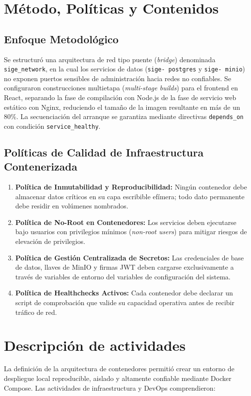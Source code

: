\documentclass[12pt,a4paper]{article}
\begin{document}
\section{Método, Políticas y Contenidos}
\subsection{Enfoque Metodológico}
Se estructuró una arquitectura de red tipo puente (\textit{bridge}) denominada \texttt{sige\_\allowbreak  network}, en la cual los servicios de datos (\texttt{sige- postgres} y \texttt{sige- minio}) no exponen puertos sensibles de administración hacia redes no confiables. Se configuraron construcciones multietapa (\textit{multi-stage builds}) para el frontend en React, separando la fase de compilación con Node.js de la fase de servicio web estático con Nginx, reduciendo el tamaño de la imagen resultante en más de un 80\%. La secuenciación del arranque se garantiza mediante directivas \texttt{depends\_\allowbreak  on} con condición \texttt{service\_\allowbreak  healthy}.

\subsection{Políticas de Calidad de Infraestructura Contenerizada}
\begin{enumerate}[leftmargin=1.5em, itemsep=2pt]
    \item \textbf{Política de Inmutabilidad y Reproducibilidad:} Ningún contenedor debe almacenar datos críticos en su capa escribible efímera; todo dato permanente debe residir en volúmenes nombrados.
    \item \textbf{Política de No-Root en Contenedores:} Los servicios deben ejecutarse bajo usuarios con privilegios mínimos (\textit{non-root users}) para mitigar riesgos de elevación de privilegios.
    \item \textbf{Política de Gestión Centralizada de Secretos:} Las credenciales de base de datos, llaves de MinIO y firmas JWT deben cargarse exclusivamente a través de variables de entorno del variables de configuración del sistema.
    \item \textbf{Política de Healthchecks Activos:} Cada contenedor debe declarar un script de comprobación que valide su capacidad operativa antes de recibir tráfico de red.
\end{enumerate}

\section{Descripción de actividades}
La definición de la arquitectura de contenedores permitió crear un entorno de despliegue local reproducible, aislado y altamente confiable mediante Docker Compose. Las actividades de infraestructura y DevOps comprendieron:
\end{document}
